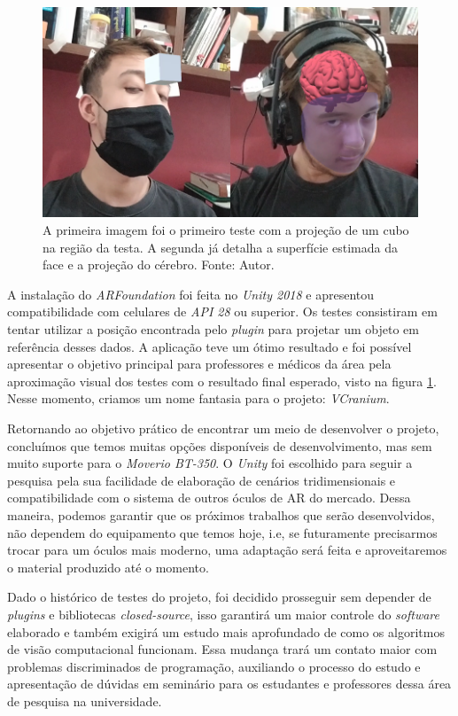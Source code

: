 \begin{figure}[ht]
    \centering
    \includegraphics[width=.65\linewidth]{figuras/VCranium.png}
    \caption{A primeira imagem foi o primeiro teste com a projeção de um cubo na região da testa. A segunda já detalha a superfície estimada da face e a projeção do cérebro. Fonte: Autor.}
    \label{fig:arfoundation}
\end{figure}

A instalação do \textit{ARFoundation} foi feita no \textit{Unity 2018} e apresentou compatibilidade com celulares de \textit{API 28} ou superior. Os testes consistiram em tentar utilizar a posição encontrada pelo \textit{plugin} para projetar um objeto em referência desses dados. A aplicação teve um ótimo resultado e foi possível apresentar o objetivo principal para professores e médicos da área pela aproximação visual dos testes com o resultado final esperado, visto na figura \ref{fig:arfoundation}. Nesse momento, criamos um nome fantasia para o projeto: \textit{VCranium}.

Retornando ao objetivo prático de encontrar um meio de desenvolver o projeto, concluímos que temos muitas opções disponíveis de desenvolvimento, mas sem muito suporte para o \textit{Moverio BT-350}. O \textit{Unity} foi escolhido para seguir a pesquisa pela sua facilidade de elaboração de cenários tridimensionais e compatibilidade com o sistema de outros óculos de AR do mercado. Dessa maneira, podemos garantir que os próximos trabalhos que serão desenvolvidos, não dependem do equipamento que temos hoje, i.e, se futuramente precisarmos trocar para um óculos mais moderno, uma adaptação será feita e aproveitaremos o material produzido até o momento.

Dado o histórico de testes do projeto, foi decidido prosseguir sem depender de \textit{plugins} e bibliotecas \textit{closed-source}, isso garantirá um maior controle do \textit{software} elaborado e também exigirá um estudo mais aprofundado de como os algoritmos de visão computacional funcionam. Essa mudança trará um contato maior com problemas discriminados de programação, auxiliando o processo do estudo e apresentação de dúvidas em seminário para os estudantes e professores dessa área de pesquisa na universidade.

